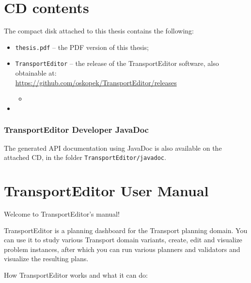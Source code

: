 
\section*{CD contents}\label{cd-contents}

The compact disk attached to this thesis contains the following:

\begin{itemize}
\item \verb+thesis.pdf+ -- the PDF version of this thesis;
\item \verb+TransportEditor+ -- the  release of the TransportEditor software, also obtainable at:\\
\url{https://github.com/oskopek/TransportEditor/releases}
\begin{itemize}
\item {}
\end{itemize}
\item {}
\end{itemize}

\subsubsection*{TransportEditor Developer JavaDoc}\label{transporteditor-developer-javadoc}

The generated API documentation using JavaDoc is also available on the attached CD, in the folder
\verb+TransportEditor/javadoc+.

\newpage

\section*{TransportEditor User Manual}\label{transporteditor-user-manual}

Welcome to TransportEditor's manual!

TransportEditor is a planning dashboard for the Transport planning domain.
You can use it to study various Transport domain variants,
create, edit and visualize problem instances, after which you can
run various planners and validators and visualize the resulting plans.

How TransportEditor works and what it can do:

